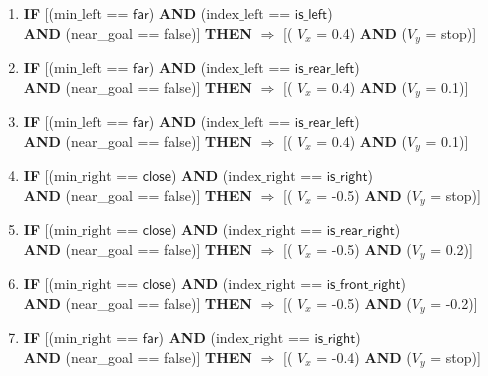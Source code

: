 \begin{enumerate}
	\item \textbf{IF} [($\text{min\_left}$ == $\textsf{far}$) \textbf{AND} ($\text{index\_left}$ == $\textsf{is\_left}$)\\
	\textbf{AND} (near\_goal == \textsf{false})]
	\textbf{THEN} $\Rightarrow$ [( $V_x$ = \textsf{0.4}) \textbf{AND} ($V_y$ = \textsf{stop})]
	
	\item \textbf{IF} [($\text{min\_left}$ == $\textsf{far}$) \textbf{AND} ($\text{index\_left}$ == $\textsf{is\_rear\_left}$)\\
	\textbf{AND} (near\_goal == \textsf{false})]
	\textbf{THEN} $\Rightarrow$ [( $V_x$ = \textsf{0.4}) \textbf{AND} ($V_y$ = \textsf{0.1})]
	
	\item \textbf{IF} [($\text{min\_left}$ == $\textsf{far}$) \textbf{AND} ($\text{index\_left}$ == $\textsf{is\_rear\_left}$)\\
	\textbf{AND} (near\_goal == \textsf{false})]
	\textbf{THEN} $\Rightarrow$ [( $V_x$ = \textsf{0.4}) \textbf{AND} ($V_y$ = \textsf{0.1})]
	
	\item \textbf{IF} [($\text{min\_right}$ == $\textsf{close}$) \textbf{AND} ($\text{index\_right}$ == $\textsf{is\_right}$)\\
	\textbf{AND} (near\_goal == \textsf{false})]
	\textbf{THEN} $\Rightarrow$ [( $V_x$ = \textsf{-0.5}) \textbf{AND} ($V_y$ = \textsf{stop})]
	
	\item \textbf{IF} [($\text{min\_right}$ == $\textsf{close}$) \textbf{AND} ($\text{index\_right}$ == $\textsf{is\_rear\_right}$)\\
	\textbf{AND} (near\_goal == \textsf{false})]
	\textbf{THEN} $\Rightarrow$ [( $V_x$ = \textsf{-0.5}) \textbf{AND} ($V_y$ = \textsf{0.2})]
	
	\item \textbf{IF} [($\text{min\_right}$ == $\textsf{close}$) \textbf{AND} ($\text{index\_right}$ == $\textsf{is\_front\_right}$)\\
	\textbf{AND} (near\_goal == \textsf{false})]
	\textbf{THEN} $\Rightarrow$ [( $V_x$ = \textsf{-0.5}) \textbf{AND} ($V_y$ = \textsf{-0.2})]
	
	\item \textbf{IF} [($\text{min\_right}$ == $\textsf{far}$) \textbf{AND} ($\text{index\_right}$ == $\textsf{is\_right}$)\\
	\textbf{AND} (near\_goal == \textsf{false})]
	\textbf{THEN} $\Rightarrow$ [( $V_x$ = \textsf{-0.4}) \textbf{AND} ($V_y$ = \textsf{stop})]
	

\end{enumerate}
